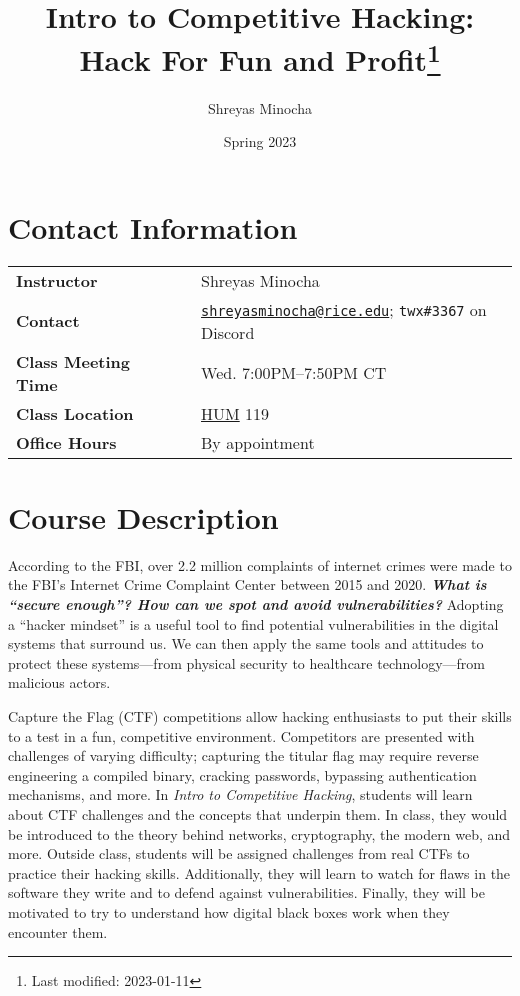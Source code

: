 \documentclass[11pt]{article}
\title{Intro to Competitive Hacking: Hack For Fun and Profit\footnote{Last modified: 2023-01-11}}
\author{Shreyas Minocha}
\date{Spring 2023}
\begin{document}
\maketitle

\begin{flushleft}
\section{Contact Information}\label{contact-information}

\setlength{\tabcolsep}{0pt}
\begin{tabular}{ll}
\textbf{Instructor} & Shreyas Minocha \\
\textbf{Contact} & \href{mailto:shreyasminocha@rice.edu}{\texttt{shreyasminocha@rice.edu}}; \texttt{twx\#3367} on Discord\\
\textbf{Class Meeting Time}~~~~~ & Wed. 7:00PM--7:50PM CT \\
\textbf{Class Location} & \href{https://www.openstreetmap.org/node/8379958483}{HUM} 119 \\
\textbf{Office Hours} & By appointment
\end{tabular}
\setlength{\tabcolsep}{6pt}

\section{Course Description}\label{course-description}

According to the FBI, over 2.2 million complaints of internet crimes were made to the FBI's Internet Crime Complaint Center between 2015 and 2020. \textit{\textbf{What is ``secure enough''? How can we spot and avoid vulnerabilities?}} Adopting a ``hacker mindset'' is a useful tool to find potential vulnerabilities in the digital systems that surround us. We can then apply the same tools and attitudes to protect these systems—from physical security to healthcare technology—from malicious actors.

Capture the Flag (CTF) competitions allow hacking enthusiasts to put their skills to a test in a fun, competitive environment. Competitors are presented with challenges of varying difficulty; capturing the titular flag may require reverse engineering a compiled binary, cracking passwords, bypassing authentication mechanisms, and more. In \textit{Intro to Competitive Hacking}, students will learn about CTF challenges and the concepts that underpin them. In class, they would be introduced to the theory behind networks, cryptography, the modern web, and more. Outside class, students will be assigned challenges from real CTFs to practice their hacking skills. Additionally, they will learn to watch for flaws in the software they write and to defend against vulnerabilities. Finally, they will be motivated to try to understand how digital black boxes work when they encounter them.


\end{flushleft}
\end{document}
